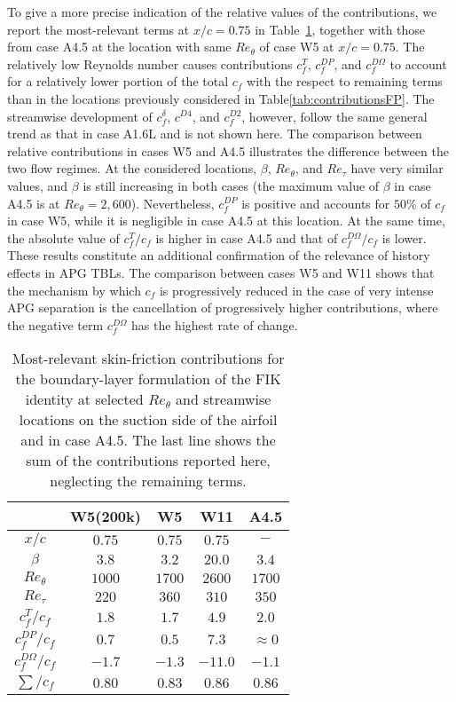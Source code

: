 To give a more precise indication of the relative values of the contributions, we report the most-relevant terms at $x/c=0.75$ in Table~\ref{tab:contributionsWING}, together with those from case A4.5 at the location with same $Re_\theta$ of case W5 at $x/c=0.75$. The relatively low Reynolds number causes contributions $c^T_f$, $c^{DP}_f$, and $c^{D\Omega}_f$ to account for a relatively lower portion of the total $c_f$ with the respect to remaining terms than in the locations previously considered in Table\ref{tab:contributionsFP}. The streamwise development of $c^\delta_f$, $c^{D4}$, and $c^{D2}_f$, however, follow the same general trend as that in case A1.6L and is not shown here. The comparison between relative contributions in cases W5 and A4.5 illustrates the difference between the two flow regimes. At the considered locations, $\beta$, $Re_\theta$, and $Re_\tau$ have very similar values, and $\beta$ is still increasing in both cases (the maximum value of $\beta$ in case A4.5 is at $Re_\theta=2,600$). Nevertheless, $c^{DP}_f$ is positive and accounts for $50\%$ of $c_f$ in case W5, while it is negligible in case A4.5 at this location. At the same time, the absolute value of $c^T_f/c_f$ is higher in case A4.5 and that of $c^{D\Omega}_f/c_f$ is lower. These results constitute an additional confirmation of the relevance of history effects in APG TBLs. The comparison between cases W5 and W11 shows that the mechanism by which $c_f$ is progressively reduced in the case of very intense APG separation is the cancellation of progressively higher contributions, where the negative term $c^{D\Omega}_f$ has the highest rate of change. 

\begin{table}
\caption{\label{tab:contributionsWING}Most-relevant skin-friction contributions for the boundary-layer formulation of the FIK identity at selected $Re_\theta$ and streamwise locations on the suction side of the airfoil and in case A4.5. The last line shows the sum of the contributions reported here, neglecting the remaining terms.}
\centering
\begin{tabular}{ccccc}
\hline \hline
 &W5(200k)&W5&{W11}&A4.5\\ \hline
$x/c$ & $0.75$ & $0.75$ & $0.75$ & $-$ \\
$\beta$ & $3.8$ & $3.2$ & $20.0$ & $3.4$ \\
$Re_\theta$ & $1000$ & $1700$ & $2600$ & $1700$ \\
$Re_\tau$ & $220$ & $360$ & $310$ & $350$ \\ \hline
$c^T_f/c_f$ & $1.8$ & $1.7$ & $4.9$ & $2.0$ \\ \hline
$c^{DP}_f/c_f$ & $0.7$ & $0.5$ & $7.3$ & $\approx0$ \\
$c^{D\Omega}_f/c_f$ & $-1.7$ & $-1.3$ & $-11.0$ & $-1.1$ \\ \hline
$\sum/c_f$ & $0.80$ & $0.83$ & $0.86$ & $0.86$   \\
\hline \hline
\end{tabular}
%  
\end{table}

